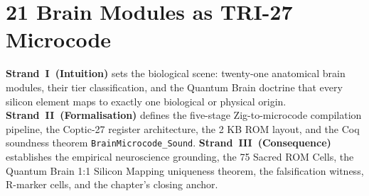 %
%
%

\chapter{21 Brain Modules as TRI-27 Microcode}
\label{ch:flos73}

\newcommand{\phipow}[1]{\ensuremath{\varphi^{#1}}}
\newcommand{\phiinv}{\ensuremath{\varphi^{-1}}}
\newcommand{\phiinvii}{\ensuremath{\varphi^{-2}}}
\newcommand{\phiinviii}{\ensuremath{\varphi^{-3}}}
\newcommand{\phisq}{\ensuremath{\varphi^{2}}}
\newcommand{\trinity}{\ensuremath{\varphi^{2}+\varphi^{-2}=3}}
\newcommand{\coqcite}[4]{%
  \textsf{Coq}: \texttt{#2} lines~#3 (\textit{#4}) $\triangleright$ \texttt{#1}}
\newcommand{\admittedbox}[2]{%
  \begin{mdframed}[linecolor=orange!60!black,linewidth=1pt]
    \textbf{Admitted (R5):} \texttt{#1} --- #2
  \end{mdframed}}
\newcommand{\Rmarker}[1]{\ensuremath{\mathcal{R}\text{-}#1}}


\bigskip
\noindent\textbf{Strand~I~(Intuition)} sets the biological scene: twenty-one
anatomical brain modules, their tier classification, and the Quantum Brain
doctrine that every silicon element maps to exactly one biological or
physical origin.
\textbf{Strand~II~(Formalisation)} defines the five-stage Zig-to-microcode
compilation pipeline, the Coptic-27 register architecture, the 2 KB ROM layout,
and the Coq soundness theorem \texttt{BrainMicrocode\_Sound}.
\textbf{Strand~III~(Consequence)} establishes the empirical neuroscience grounding,
the 75 Sacred ROM Cells, the Quantum Brain 1:1 Silicon Mapping uniqueness theorem,
the falsification witness, R-marker cells, and the chapter's closing anchor.

